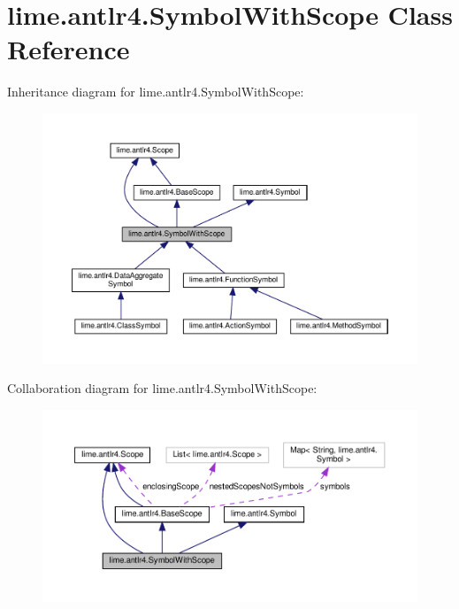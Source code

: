 \hypertarget{classlime_1_1antlr4_1_1SymbolWithScope}{}\section{lime.\+antlr4.\+Symbol\+With\+Scope Class Reference}
\label{classlime_1_1antlr4_1_1SymbolWithScope}


Inheritance diagram for lime.\+antlr4.\+Symbol\+With\+Scope\+:
\nopagebreak
\begin{figure}[H]
\begin{center}
\leavevmode
\includegraphics[width=350pt]{classlime_1_1antlr4_1_1SymbolWithScope__inherit__graph}
\end{center}
\end{figure}


Collaboration diagram for lime.\+antlr4.\+Symbol\+With\+Scope\+:
\nopagebreak
\begin{figure}[H]
\begin{center}
\leavevmode
\includegraphics[width=350pt]{classlime_1_1antlr4_1_1SymbolWithScope__coll__graph}
\end{center}
\end{figure}
